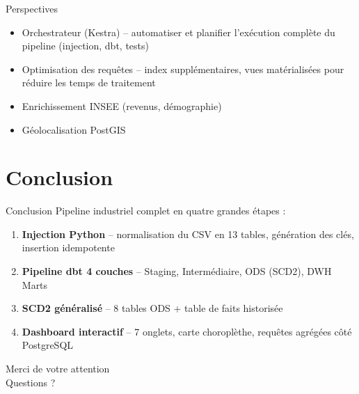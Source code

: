 \documentclass[12pt,aspectratio=169]{beamer}
\newcommand{\dbt}{dbt}
\begin{document}
\begin{frame}{Perspectives}
  \begin{itemize}
    \item<+-> \alert{Orchestrateur} (Kestra) -- automatiser et planifier
          l'exécution complète du pipeline (injection, \dbt{}, tests)
    \item<+-> \alert{Optimisation des requêtes} -- index supplémentaires, vues
          matérialisées pour réduire les temps de traitement
    \item<+-> Enrichissement \alert{INSEE} (revenus, démographie)
    \item<+-> Géolocalisation \alert{PostGIS}
  \end{itemize}
\end{frame}

\section{Conclusion}

\begin{frame}{Conclusion}
  Pipeline industriel complet en quatre grandes étapes :
  \begin{enumerate}
    \item<+-> \textbf{Injection Python} -- normalisation du CSV en 13 tables,
          génération des clés, insertion idempotente
    \item<+-> \textbf{Pipeline \dbt{} 4 couches} -- Staging, Intermédiaire,
          ODS (SCD2), DWH Marts
    \item<+-> \textbf{SCD2 généralisé} -- 8 tables ODS + table de faits
          historisée
    \item<+-> \textbf{Dashboard interactif} -- 7 onglets, carte choroplèthe,
          requêtes agrégées côté PostgreSQL
  \end{enumerate}
\end{frame}

\begin{frame}
  \begin{center}
    {\Huge Merci de votre attention}\\[1.5em]
    {\Large Questions ?}
  \end{center}
\end{frame}
\end{document}
